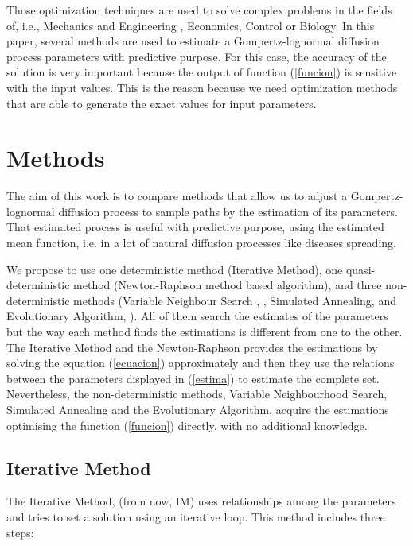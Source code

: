 \documentclass{sig-alternate}
\begin{document}
Those optimization techniques are used to solve complex problems in the fields of, i.e., Mechanics and Engineering \cite{Tabucanon1996}, Economics, Control or Biology.
In this paper, several methods are used to estimate a
Gompertz-lognormal diffusion process parameters with predictive
purpose. For this case, the accuracy of the solution is very important
because the output of function (\ref{funcion}) is sensitive with the
input values. This is the reason because we need optimization methods
that are able to generate the exact values for input parameters.   


\section{Methods}
\label{sec:methods}

The aim of this work is to compare methods that allow us to adjust a
Gompertz-lognormal diffusion process to sample paths by the estimation
of its parameters. That estimated process is useful with predictive
purpose, using the estimated mean function, i.e. in a lot of natural
diffusion processes like diseases spreading. 

We propose to use one deterministic method (Iterative Method), one quasi-deterministic method (Newton-Raphson method based algorithm), and three non-deterministic methods (Variable Neighbour Search , \cite{VNS}, Simulated Annealing, \cite{SA} and Evolutionary Algorithm, \cite{EA}). All of them search the estimates of the parameters but the way each method finds the estimations is different from one to the other. The Iterative Method and the Newton-Raphson  provides the estimations by solving the equation (\ref{ecuacion}) approximately and then they use the relations between the parameters displayed in (\ref{estima}) to estimate the complete set. Nevertheless, the non-deterministic methods, Variable Neighbourhood Search, Simulated Annealing and the Evolutionary Algorithm, acquire the estimations optimising the function (\ref{funcion}) directly, with no additional knowledge.


\subsection{Iterative Method}
\label{subsec:iterative}
The Iterative Method, (from now, IM) uses relationships among the parameters and tries to set a solution using an iterative loop.  This method includes three steps:
\end{document}
